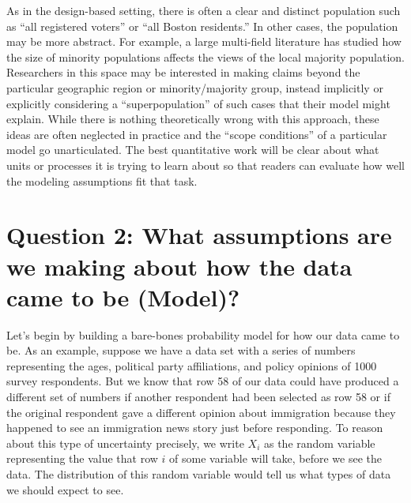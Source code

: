 \documentclass[
  letterpaper,
  DIV=11,
  numbers=noendperiod]{scrreprt}
\theoremstyle{plain}
\theoremstyle{definition}
\theoremstyle{definition}
\theoremstyle{remark}
\begin{document}
As in the design-based setting, there is often a clear and distinct
population such as ``all registered voters'' or ``all Boston
residents.'' In other cases, the population may be more abstract. For
example, a large multi-field literature has studied how the size of
minority populations affects the views of the local majority population.
Researchers in this space may be interested in making claims beyond the
particular geographic region or minority/majority group, instead
implicitly or explicitly considering a ``superpopulation'' of such cases
that their model might explain. While there is nothing theoretically
wrong with this approach, these ideas are often neglected in practice
and the ``scope conditions'' of a particular model go unarticulated. The
best quantitative work will be clear about what units or processes it is
trying to learn about so that readers can evaluate how well the modeling
assumptions fit that task.

\hypertarget{question-2-what-assumptions-are-we-making-about-how-the-data-came-to-be-model}{%
\section{Question 2: What assumptions are we making about how the data
came to be
(Model)?}\label{question-2-what-assumptions-are-we-making-about-how-the-data-came-to-be-model}}

Let's begin by building a bare-bones probability model for how our data
came to be. As an example, suppose we have a data set with a series of
numbers representing the ages, political party affiliations, and policy
opinions of 1000 survey respondents. But we know that row 58 of our data
could have produced a different set of numbers if another respondent had
been selected as row 58 or if the original respondent gave a different
opinion about immigration because they happened to see an immigration
news story just before responding. To reason about this type of
uncertainty precisely, we write \(X_i\) as the random variable
representing the value that row \(i\) of some variable will take, before
we see the data. The distribution of this random variable would tell us
what types of data we should expect to see.
\end{document}
